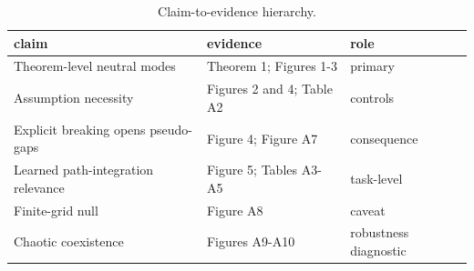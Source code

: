 \begin{table}[t]
\centering
\small
\caption{Claim-to-evidence hierarchy.}
\label{tab:claim-hierarchy}
\begin{tabular}{lll}
\toprule
claim & evidence & role \\
\midrule
Theorem-level neutral modes & Theorem 1; Figures 1-3 & primary \\
Assumption necessity & Figures 2 and 4; Table A2 & controls \\
Explicit breaking opens pseudo-gaps & Figure 4; Figure A7 & consequence \\
Learned path-integration relevance & Figure 5; Tables A3-A5 & task-level \\
Finite-grid null & Figure A8 & caveat \\
Chaotic coexistence & Figures A9-A10 & robustness diagnostic \\
\bottomrule
\end{tabular}
\end{table}

